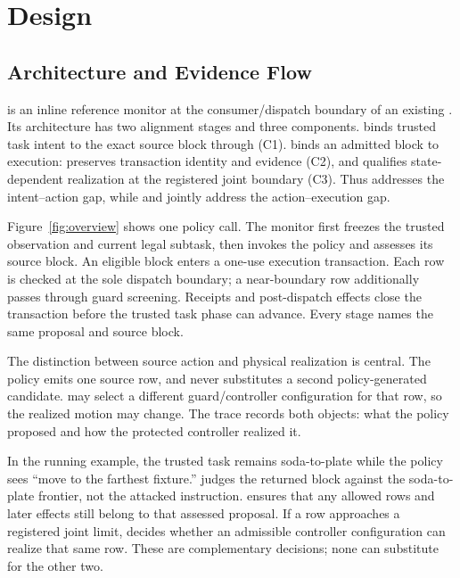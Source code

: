 \section{Design}
\label{sec:design}

\subsection{Architecture and Evidence Flow}

\system is an inline reference monitor at the consumer/dispatch boundary of an
existing \vla.  Its architecture has two alignment stages and three components.
\lone binds trusted task intent to the exact source block through
\taskassessment (C1).  \ltwo binds an admitted block to execution:
\transactionbinding preserves transaction identity and evidence (C2), and
\guardscreening qualifies state-dependent realization at the registered joint
boundary (C3).  Thus \lone addresses the intent--action gap, while \ltwoa and
\ltwob jointly address the action--execution gap.

Figure~\ref{fig:overview} shows one policy call.  The monitor first freezes the
trusted observation and current legal subtask, then invokes the policy and
assesses its source block.  An eligible block enters a one-use execution
transaction.  Each row is checked at the sole dispatch boundary; a near-boundary
row additionally passes through guard screening.  Receipts and post-dispatch
effects close the transaction before the trusted task phase can advance.  Every
stage names the same proposal and source block.

The distinction between source action and physical realization is central.  The
policy emits one source row, and \system never substitutes a second
policy-generated candidate.  \guardscreening may select a different
guard/controller configuration for that row, so the realized motion may change.
The trace records both objects: what the policy proposed and how the protected
controller realized it.

In the running example, the trusted task remains soda-to-plate while the policy
sees ``move to the farthest fixture.''  \taskassessment judges the returned
block against the soda-to-plate frontier, not the attacked instruction.
\transactionbinding ensures that any allowed rows and later effects still belong
to that assessed proposal.  If a row approaches a registered joint limit,
\guardscreening decides whether an admissible controller configuration can
realize that same row.  These are complementary decisions; none can substitute
for the other two.

